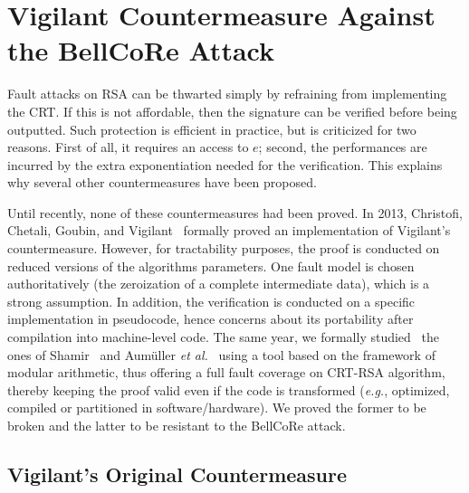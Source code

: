 \documentclass[10pt]{article}
\theoremstyle{definition}
\theoremstyle{theorem}
\newcommand{\eg}{\textit{e.g.}}
\newcommand{\etal}{\textit{et al.}\xspace}
\begin{document}
\section{Vigilant Countermeasure Against the BellCoRe Attack}
\label{sec-vigilant}

Fault attacks on RSA can be thwarted simply by refraining from implementing the CRT.
If this is not affordable, then the signature can be verified before being outputted.
Such protection is efficient in practice, but is criticized for two reasons.
First of all, it requires an access to $e$;
second, the performances are incurred by the extra exponentiation needed for the verification.
This explains why several other countermeasures have been proposed.

Until recently, none of these countermeasures had been proved.
In 2013, Christofi, Chetali, Goubin, and Vigilant~\cite{JCEN-Christofi13} formally proved an implementation of Vigilant's countermeasure.
However, for tractability purposes, the proof is conducted on reduced versions of the algorithms parameters.
One fault model is chosen authoritatively (the zeroization of a complete intermediate data), which is a strong assumption.
In addition, the verification is conducted on a specific implementation in pseudocode, hence concerns about its portability after compilation into machine-level code.
The same year, we formally studied~\cite{cryptoeprint:2013:506} the ones of Shamir~\cite{shamir-patent-rsa-crt} and Aumüller \etal~\cite{DBLP:conf/ches/AumullerBFHS02} using a tool based on the framework of modular arithmetic, thus offering a full fault coverage on CRT-RSA algorithm, thereby keeping the proof valid even if the code is transformed (\eg, optimized, compiled or partitioned in software/hardware).
We proved the former to be broken and the latter to be resistant to the BellCoRe attack.

\subsection{Vigilant's Original Countermeasure}
\label{sec-vigilant-orig}
\end{document}
